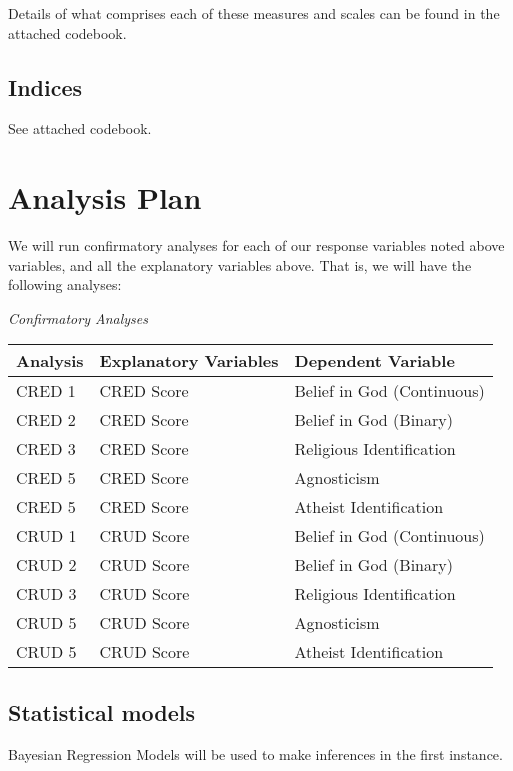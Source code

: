 \documentclass[]{article}
\begin{document}
Details of what comprises each of these measures and scales can be found
in the attached codebook.

\hypertarget{indices}{%
\subsection{Indices}\label{indices}}

See attached codebook.

\hypertarget{analysis-plan}{%
\section{Analysis Plan}\label{analysis-plan}}

We will run confirmatory analyses for each of our response variables
noted above variables, and all the explanatory variables above. That is,
we will have the following analyses:

\emph{Confirmatory Analyses}

\begin{longtable}[]{@{}lll@{}}
\toprule\noalign{}
Analysis & Explanatory Variables & Dependent Variable \\
\midrule\noalign{}
\endhead
\bottomrule\noalign{}
\endlastfoot
CRED 1 & CRED Score & Belief in God (Continuous) \\
CRED 2 & CRED Score & Belief in God (Binary) \\
CRED 3 & CRED Score & Religious Identification \\
CRED 5 & CRED Score & Agnosticism \\
CRED 5 & CRED Score & Atheist Identification \\
CRUD 1 & CRUD Score & Belief in God (Continuous) \\
CRUD 2 & CRUD Score & Belief in God (Binary) \\
CRUD 3 & CRUD Score & Religious Identification \\
CRUD 5 & CRUD Score & Agnosticism \\
CRUD 5 & CRUD Score & Atheist Identification \\
\end{longtable}

\hypertarget{statistical-models}{%
\subsection{Statistical models}\label{statistical-models}}

Bayesian Regression Models will be used to make inferences in the first
instance.
\end{document}
